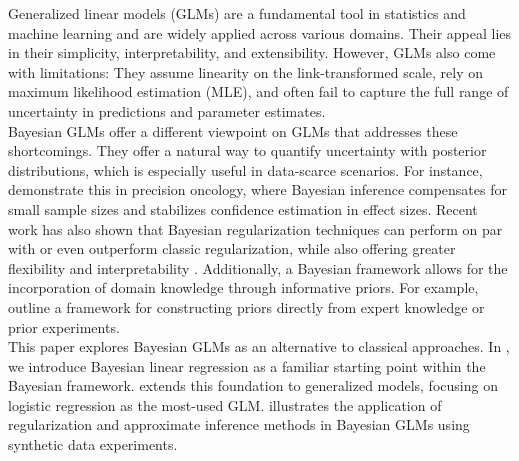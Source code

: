 Generalized linear models (GLMs) are a fundamental tool in statistics and machine learning and are widely applied across various domains.
Their appeal lies in their simplicity, interpretability, and extensibility.
However, GLMs also come with limitations:
They assume linearity on the link-transformed scale, rely on maximum likelihood estimation (MLE), and often fail to capture the full range of uncertainty in predictions and parameter estimates.\\

Bayesian GLMs offer a different viewpoint on GLMs that addresses these shortcomings.
They offer a natural way to quantify uncertainty with posterior distributions, which is especially useful in data-scarce scenarios.
For instance, \citet{sondhi_bayesian_2021} demonstrate this in precision oncology, where Bayesian inference compensates for small sample sizes and stabilizes confidence estimation in effect sizes.
Recent work has also shown that Bayesian regularization techniques can perform on par with or even outperform classic regularization, while also offering greater flexibility and interpretability \citep[see e.g.][]{van_erp_shrinkage_2019,celeux_regularization_2012}.
Additionally, a Bayesian framework allows for the incorporation of domain knowledge through informative priors.
For example, \citet{chien_informative_2023} outline a framework for constructing priors directly from expert knowledge or prior experiments.\\

This paper explores Bayesian GLMs as an alternative to classical approaches.
In , we introduce Bayesian linear regression as a familiar starting point within the Bayesian framework.
 extends this foundation to generalized models, focusing on logistic regression as the most-used GLM.
 illustrates the application of regularization and approximate inference methods in Bayesian GLMs using synthetic data experiments.\\



